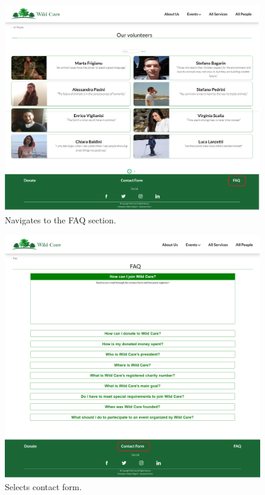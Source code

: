 	\begin{figure}[h!]
		\centering
		\begin{minipage}[b]{1\textwidth}
    			\includegraphics[width=\textwidth]{./assets/mockups/people_faq.png}
			\caption{Navigates to the FAQ section.}
		\end{minipage}
	\end{figure}

	\begin{figure}[h!]
		\centering
		\begin{minipage}[b]{1\textwidth}
    			\includegraphics[width=\textwidth]{./assets/mockups/faq_contactform.png}
			\caption{Selects contact form.}
		\end{minipage}
	\end{figure}


